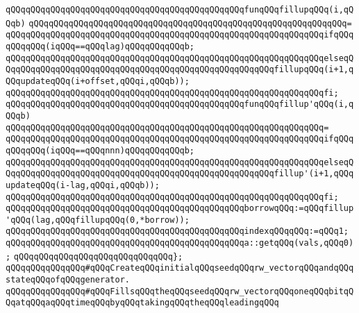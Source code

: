 \newline
\verb|qQQqqQQqqQQqqQQqqQQqqQQqqQQqqQQqqQQqqQQqqQQqqQQqfunqQQqfillupqQQq(i,qQQqb)|\newline
\verb|qQQqqQQqqQQqqQQqqQQqqQQqqQQqqQQqqQQqqQQqqQQqqQQqqQQqqQQqqQQqqQQq=|\newline
\verb|qQQqqQQqqQQqqQQqqQQqqQQqqQQqqQQqqQQqqQQqqQQqqQQqqQQqqQQqqQQqqQQqifqQQqqQQqqQQq(iqQQq==qQQqlag)qQQqqQQqqQQqb;|\newline
\verb|qQQqqQQqqQQqqQQqqQQqqQQqqQQqqQQqqQQqqQQqqQQqqQQqqQQqqQQqqQQqqQQqelseqQQqqQQqqQQqqQQqqQQqqQQqqQQqqQQqqQQqqQQqqQQqqQQqqQQqqQQqfillupqQQq(i+1,qQQqupdateqQQq(i+offset,qQQqi,qQQqb));|\newline
\verb|qQQqqQQqqQQqqQQqqQQqqQQqqQQqqQQqqQQqqQQqqQQqqQQqqQQqqQQqqQQqqQQqfi;|\newline
\newline
\verb|qQQqqQQqqQQqqQQqqQQqqQQqqQQqqQQqqQQqqQQqqQQqqQQqfunqQQqfillup'qQQq(i,qQQqb)|\newline
\verb|qQQqqQQqqQQqqQQqqQQqqQQqqQQqqQQqqQQqqQQqqQQqqQQqqQQqqQQqqQQqqQQq=|\newline
\verb|qQQqqQQqqQQqqQQqqQQqqQQqqQQqqQQqqQQqqQQqqQQqqQQqqQQqqQQqqQQqqQQqifqQQqqQQqqQQq(iqQQq==qQQqnnn)qQQqqQQqqQQqb;|\newline
\verb|qQQqqQQqqQQqqQQqqQQqqQQqqQQqqQQqqQQqqQQqqQQqqQQqqQQqqQQqqQQqqQQqelseqQQqqQQqqQQqqQQqqQQqqQQqqQQqqQQqqQQqqQQqqQQqqQQqqQQqqQQqfillup'(i+1,qQQqupdateqQQq(i-lag,qQQqi,qQQqb));|\newline
\verb|qQQqqQQqqQQqqQQqqQQqqQQqqQQqqQQqqQQqqQQqqQQqqQQqqQQqqQQqqQQqqQQqfi;|\newline
\newline
\verb|qQQqqQQqqQQqqQQqqQQqqQQqqQQqqQQqqQQqqQQqqQQqqQQqborrowqQQq:=qQQqfillup'qQQq(lag,qQQqfillupqQQq(0,*borrow));|\newline
\verb|qQQqqQQqqQQqqQQqqQQqqQQqqQQqqQQqqQQqqQQqqQQqqQQqindexqQQqqQQq:=qQQq1;|\newline
\newline
\verb|qQQqqQQqqQQqqQQqqQQqqQQqqQQqqQQqqQQqqQQqqQQqqQQqa::getqQQq(vals,qQQq0);|\newline
\verb|qQQqqQQqqQQqqQQqqQQqqQQqqQQqqQQq};|\newline
\newline
\verb|qQQqqQQqqQQqqQQq#qQQqCreateqQQqinitialqQQqseedqQQqrw_vectorqQQqandqQQqstateqQQqofqQQqgenerator.|\newline
\verb|qQQqqQQqqQQqqQQq#qQQqFillsqQQqtheqQQqseedqQQqrw_vectorqQQqoneqQQqbitqQQqatqQQqaqQQqtimeqQQqbyqQQqtakingqQQqtheqQQqleadingqQQq|\newline
